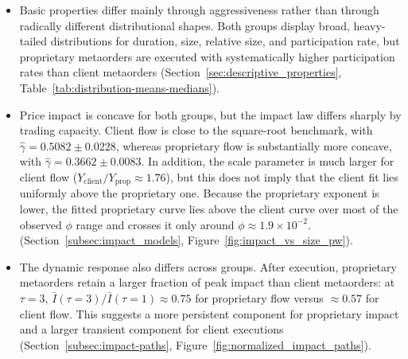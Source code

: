 \documentclass[11pt]{article}
\begin{document}
\begin{itemize}
  \item Basic properties differ mainly through aggressiveness rather than through radically different distributional
  shapes. Both groups display broad, heavy-tailed distributions for duration, size, relative size, and participation rate, but
  proprietary metaorders are executed with systematically higher participation rates than client metaorders
  (Section~\ref{sec:descriptive_properties}, Table~\ref{tab:distribution-means-medians}).

  \item Price impact is concave for both groups, but the impact law differs sharply by trading capacity. Client flow is
  close to the square-root benchmark, with $\hat\gamma = 0.5082 \pm 0.0228$, whereas proprietary flow is substantially more concave,
  with $\hat\gamma = 0.3662 \pm 0.0083$. In addition, the scale parameter is much larger for client flow
  ($Y_{\mathrm{client}}/Y_{\mathrm{prop}} \approx 1.76$), but this does not imply that the client fit lies
  uniformly above the proprietary one. Because the proprietary exponent is lower, the fitted proprietary curve lies above the
  client curve over most of the observed $\phi$ range and crosses it only around $\phi \approx 1.9 \times 10^{-2}$.
  (Section~\ref{subsec:impact_models}, Figure~\ref{fig:impact_vs_size_pw}).
  
  \item The dynamic response also differs across groups. After execution, proprietary metaorders retain a larger fraction
  of peak impact than client metaorders: at $\tau=3$, $\bar I(\tau{=}3)/\bar I(\tau{=}1)\approx 0.75$ for proprietary flow versus
  $\approx 0.57$ for client flow. This suggests a more persistent component for proprietary impact and a larger transient component
  for client executions (Section~\ref{subsec:impact-paths}, Figure~\ref{fig:normalized_impact_paths}).


\end{itemize}
\end{document}

